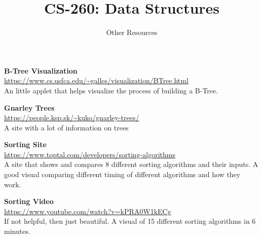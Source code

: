 \documentclass[10pt,letterpaper,oneside]{article}
\title{CS-260: Data Structures}
\author{Other Resources}
\date{}
\begin{document}
\maketitle

\textbf{B-Tree Visualization} \\
\url{https://www.cs.usfca.edu/~galles/visualization/BTree.html} \\
An little applet that helps visualize the process of building a B-Tree.
\vspace{5mm}

\textbf{Gnarley Trees} \\
\url{https://people.ksp.sk/~kuko/gnarley-trees/} \\
A site with a lot of information on trees
\vspace{5mm}

\textbf{Sorting Site} \\
\url{https://www.toptal.com/developers/sorting-algorithms} \\
A site that shows and compares 8 different sorting algorithms and their inputs.
A good visual comparing different timing of different algorithms and how they
work.
\vspace{5mm}

\textbf{Sorting Video} \\
\url{https://www.youtube.com/watch?v=kPRA0W1kECg} \\
If not helpful, then just beautiful.
A visual of 15 different sorting algorithms in 6 minutes.
\end{document}
